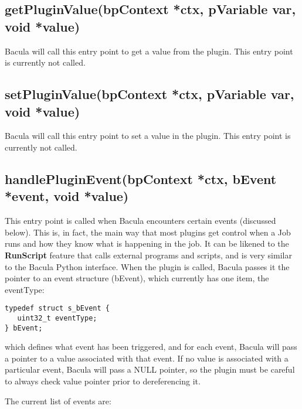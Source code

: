 \subsection{getPluginValue(bpContext *ctx, pVariable var, void *value)} 
Bacula will call this entry point to get
a value from the plugin.  This entry point is currently not called.

\subsection{setPluginValue(bpContext *ctx, pVariable var, void *value)}
Bacula will call this entry point to set
a value in the plugin.  This entry point is currently not called.
 
\subsection{handlePluginEvent(bpContext *ctx, bEvent *event, void *value)}
This entry point is called when Bacula
encounters certain events (discussed below). This is, in fact, the 
main way that most plugins get control when a Job runs and how
they know what is happening in the job. It can be likened to the
{\bf RunScript} feature that calls external programs and scripts,
and is very similar to the Bacula Python interface.
When the plugin is called, Bacula passes it the pointer to an event
structure (bEvent), which currently has one item, the eventType:

\begin{verbatim}
typedef struct s_bEvent {
   uint32_t eventType;
} bEvent;
\end{verbatim}

  which defines what event has been triggered, and for each event,
  Bacula will pass a pointer to a value associated with that event.
  If no value is associated with a particular event, Bacula will 
  pass a NULL pointer, so the plugin must be careful to always check
  value pointer prior to dereferencing it.
  
  The current list of events are:

